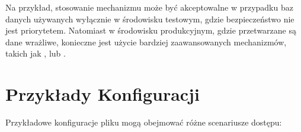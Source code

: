 \documentclass[letterpaper,10pt,polish]{sphinxmanual}
\begin{document}
\sphinxAtStartPar
Na przykład, stosowanie mechanizmu  może być akceptowalne w
przypadku baz danych używanych wyłącznie w środowisku testowym, gdzie
bezpieczeństwo nie jest priorytetem. Natomiast w środowisku
produkcyjnym, gdzie przetwarzane są dane wrażliwe, konieczne jest użycie
bardziej zaawansowanych mechanizmów, takich jak ,
 lub .


\section{Przykłady Konfiguracji}
\label{\detokenize{sprawozdanie/source/rozdzialy/rozdzial1:przyklady-konfiguracji}}
\sphinxAtStartPar
Przykładowe konfiguracje pliku  mogą obejmować różne
scenariusze dostępu:
\end{document}
